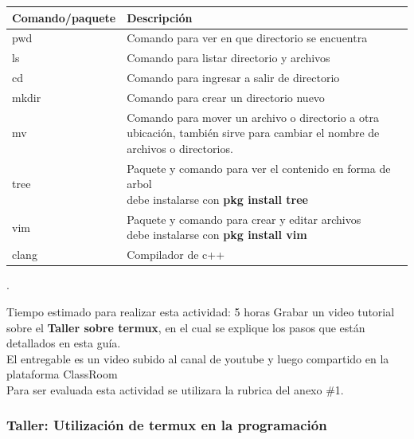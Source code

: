 \documentclass[a4paper,12pt,spanish]{article}
\begin{document}
\begin{tabular}[H]{|l|m{11cm}|}
  \hline
  Comando/paquete & Descripción  \\ \hline \hline
  pwd & Comando para ver en que directorio se encuentra \\ \hdashline
  ls & Comando para listar directorio y archivos \\ \hdashline
  cd & Comando para ingresar a salir de directorio \\ \hdashline
  mkdir & Comando para crear un directorio nuevo   \\ \hdashline
  mv & Comando para mover un archivo o directorio a otra ubicación, también sirve para cambiar el nombre de archivos o directorios. \\ \hline \hline
  tree & \makecell[l]{Paquete y comando para ver el contenido en forma de arbol \\ debe instalarse con \textbf{pkg install tree}} \\ \hdashline
  vim & \makecell[l]{Paquete y comando para crear y editar archivos \\ debe instalarse con \textbf{pkg install vim}} \\ \hdashline
  clang & Compilador de c++\\   \hline
\end{tabular}

\newpage
.
\vspace{1cm}\\
\begin{tcolorbox}[skin=widget,
boxrule=1mm,
coltitle=black,
colframe=blue!45!white,
colback=blue!15!white,
width=(1\linewidth),before=\hfill,after=\hfill,
adjusted title={{\Large Actividad C1-1}:\textbf{Taller sobre el uso de termux}}]
Tiempo estimado para realizar esta actividad: 5 horas
\tcblower
Grabar un video tutorial sobre el  \textbf{Taller sobre termux}, en el cual se explique los pasos que están detallados en esta guía.\\ 

El entregable es un video subido al canal de youtube y luego compartido en la plataforma ClassRoom \\

Para ser evaluada esta actividad se utilizara la rubrica del anexo \#1.


\end{tcolorbox}



\subsubsection{Taller: Utilización de termux en la programación}
\label{sec:tall-util-de}
\end{document}

